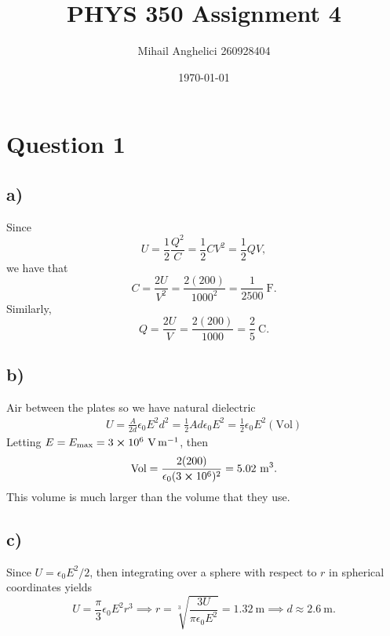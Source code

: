 \documentclass[
	12pt,
	]{article}
\title{PHYS 350 Assignment 4}
\author{Mihail Anghelici 260928404 }
\date{\today}
\newcommand{\ep}{\epsilon}
\theoremstyle{definition}
\theoremstyle{definition}
\theoremstyle{definition}
\theoremstyle{definition}
\theoremstyle{definition}
\theoremstyle{example}
\theoremstyle{note}
\theoremstyle{remark}
\theoremstyle{example}
\begin{document}
	\maketitle
		\section*{Question 1}
			\subsection*{a) }
				Since 
				$$ U = \frac12 \frac{Q^{2}}{C} = \frac12 CV^{2} = \frac12 QV ,$$
				we have that 
				$$ C = \frac{2U}{V^{2}} = \frac{2(200)}{1000^{2}} = \frac{1}{2500} \ \si{\farad}.$$
				Similarly, 
				$$ Q = \frac{2U}{V} = \frac{2(200)}{1000} = \frac25 \ \si{\coulomb}. $$
			\subsection*{b) } 
				Air between the plates so we have natural dielectric 
				\begin{gather*}
					 U = \frac{A}{2d} \epsilon_{0}  E^{2} d^{2} = \frac12 Ad \epsilon_{0} E^{2} = \frac12 \epsilon_{0} E^{2} (\text{Vol}) 
				\end{gather*}
				Letting $E = E_{\text{max}} = 3 \cross 10^{6} \ \si{\volt\per\meter}$, then 
				$$ \text{Vol} = \frac{2(200)}{\epsilon_{0}(3 \cross 10^{6})^{2}} = 5.02 \ \si{\meter\cubed}.$$
				This volume is much larger than the volume that they use. 
			\subsection*{c) }
				Since $U = \epsilon_{0} E^{2} / 2$, then integrating over a sphere with respect to $r$ in spherical coordinates yields 
				$$  U = \frac{\pi}{3} \ep_{0} E^{2} r^{3} \implies r = \sqrt[3]{\frac{3U}{\pi \ep_{0} E^{2}} } = 1.32 \ \si{\meter} \implies d \approx 2.6 \ \si{\meter}.$$ 
\end{document}
